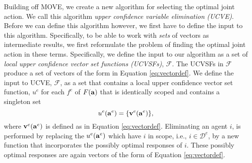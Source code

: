 \documentclass{article}
\begin{document}
Building off MOVE, we create a new algorithm for selecting the optimal joint action. We call this algorithm \emph{upper confidence variable elimination (UCVE)}. Before we can define this algorithm however, we first have to define the input to this algorithm. Specifically, to be able to work with \emph{sets} of vectors as intermediate results, we first reformulate the problem of finding the optimal joint action in these terms. Specifically, we define the input to our algorithm as a set of \emph{local upper confidence vector set functions (UCVSFs)}, $\mathcal{F}$. The UCVSFs in $\mathcal{F}$ produce a set of vectors of the form in Equation \ref{eq:vectordef}.
We define the input to UCVE, $\mathcal{F}$, as a set that contains a local upper confidence vector set function, $u^e$ for each $f^e$ of $F({\bf a})$ that is identically scoped and contains a singleton set 
\[u^e({\bf a}^e) = \{ {\bf v}^e({\bf a}^e) \}, \]
where ${\bf v}^e({\bf a}^e)$ is defined as in Equation \ref{eq:vectordef}. 
Eliminating an agent $i$, is performed by replacing the $u^e({\bf a}^e)$ which have $i$ in scope, i.e., $i \in \mathcal{D}^e$, by a new function that incorporates the possibly optimal responses of $i$. These possibly optimal responses are again vectors of the form of Equation \ref{eq:vectordef}.  
\end{document}
